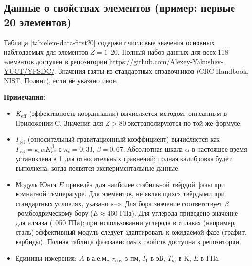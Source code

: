 \documentclass[12pt,a4paper]{article}
\newcommand{\Keff}{K_{\mathrm{eff}}}
\begin{document}
	
	
	\subsection{Данные о свойствах элементов (пример: первые 20 элементов)}
	
	Таблица \ref{tab:elem-data-first20} содержит числовые значения основных наблюдаемых для элементов \(Z=1\)–\(20\). Полный набор данных для всех 118 элементов доступен в репозитории \url{https://github.com/Alexey-Yakushev-YUCT/YPSDC/}. Значения взяты из стандартных справочников (CRC Handbook, NIST, Полинг), если не указано иное.
	
	\textbf{Примечания:}
	\begin{itemize}
		\item \(\Keff\) (эффективность координации) вычисляется методом, описанным в Приложении C. Значения для \(Z>80\) экстраполируются по той же формуле.
		\item \(\Gamma_{\text{rel}}\) (относительный гравитационный коэффициент) вычисляется как \(\Gamma_{\text{rel}} = \kappa_c \alpha \Keff^{\beta}\) с \(\kappa_c=0,33\), \(\beta=0,67\). Абсолютная шкала \(\alpha\) в настоящее время установлена в 1 для относительных сравнений; полная калибровка будет выполнена, когда появятся экспериментальные данные.
		\item Модуль Юнга \(E\) приведён для наиболее стабильной твёрдой фазы при комнатной температуре. Для элементов, не являющихся твёрдыми при стандартных условиях, указано «–». Для бора значение соответствует \(\beta\)-ромбоэдрическому бору (\(E \approx 460\) ГПа). Для углерода приведено значение для алмаза (1050 ГПа); при использовании углерода в сплавах (например, сталь) эффективный модуль следует адаптировать к ожидаемой фазе (графит, карбиды). Полная таблица фазозависимых свойств доступна в репозитории.
		\item Единицы измерения: \(A\) в а.е.м., \(r_{\text{cov}}\) в пм, \(I_1\) в эВ, \(T_m\) в K, \(E\) в ГПа.
	\end{itemize}
	
\end{document}
